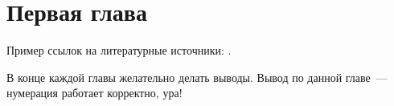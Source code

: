 \chapter{Первая глава}

Пример ссылок на литературные источники: \cite{example-english, example-russian}.

\chapterconclusion

В конце каждой главы желательно делать выводы. Вывод по данной главе~--- нумерация работает корректно, ура!
